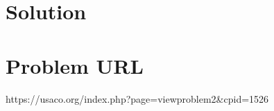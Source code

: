 \documentclass[12pt]{article}
\begin{document}
\section*{Solution}


\section*{Problem URL}
https://usaco.org/index.php?page=viewproblem2&cpid=1526
\end{document}
